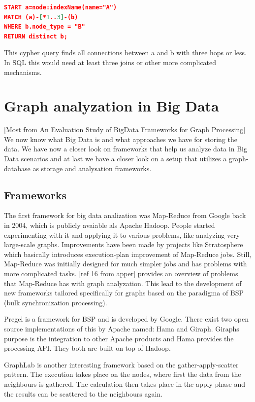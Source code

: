 \documentclass{acm_proc_article-sp}
\begin{document}
\begin{lstlisting}[language=json,firstnumber=1]
START a=node:indexName(name="A")
MATCH (a)-[*1..3]-(b)
WHERE b.node_type = "B"
RETURN distinct b;
\end{lstlisting}

This cypher query finds all connections between a and b with three hops or less. In SQL this would need at least three joins or other more complicated mechanisms.


\section{Graph analyzation in Big Data}

[Most from An Evaluation Study of BigData Frameworks for Graph Processing]
We now know what Big Data is and what approaches we have for storing the data. We have now a closer look on frameworks that help us analyze data in Big Data scenarios and at last we have a closer look on a setup that utilizes a graph-database as storage and analysation frameworks.

\subsection{Frameworks}

The first framework for big data analization was Map-Reduce from Google back in 2004, which is publicly avaiable als Apache Hadoop. People started experimenting with it and applying it to various problems, like analyzing very large-scale graphs. Improvements have been made by projects like Stratosphere which basically introduces execution-plan improvement of Map-Reduce jobs. Still, Map-Reduce was initially designed for much simpler jobs and has problems with more complicated tasks. [ref 16 from apper] provides an overview of problems that Map-Reduce has with graph analyzation. This lead to the development of new frameworks tailored specifically for graphs based on the paradigma of BSP (bulk synchronization processing).

Pregel is a framework for BSP and is developed by Google. There exist two open source implementations of this by Apache named: Hama and Giraph. Giraphs purpose is the integration to other Apache products and Hama provides the processing API. They both are built on top of Hadoop.

GraphLab is another interesting framework based on the gather-apply-scatter pattern. The execution takes place on the nodes, where first the data from the neighbours is gathered. The calculation then takes place in the apply phase and the results can be scattered to the neighbours again. 
\end{document}
